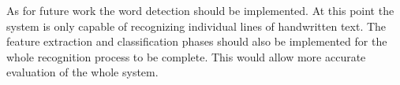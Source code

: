 \documentclass{article}
\begin{document}
\begin{multicols}{2}
          As for future work the word detection should be implemented. At this point the system is only capable of recognizing individual lines of handwritten text. The feature extraction and classification phases should also be implemented for the whole recognition process to be complete. This would allow more accurate evaluation of the whole system.

   \end{multicols}
\end{document}
